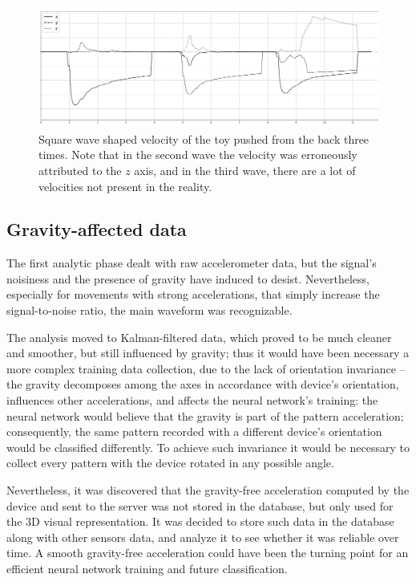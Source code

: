 \clearpage
\begin{figure}
	\includegraphics[width=\textwidth]{img/square.png}	
    \caption{Square wave shaped velocity of the toy pushed from the back three times. Note that in the second wave the velocity was erroneously attributed to the $z$ axis, and in the third wave, there are a lot of velocities not present in the reality.}
\end{figure}
\clearpage

\subsection{Gravity-affected data}
The first analytic phase dealt with raw accelerometer data, but the signal's noisiness and the presence of gravity have induced to desist. Nevertheless, especially for movements with strong accelerations, that simply increase the signal-to-noise ratio, the main waveform was recognizable.
\bigbreak

The analysis moved to Kalman-filtered data, which proved to be much cleaner and smoother, but still influenced by gravity; thus it would have been necessary a more complex training data collection, due to the lack of orientation invariance – the gravity decomposes among the axes in accordance with device's orientation, influences other accelerations, and affects the neural network's training: the neural network would believe that the gravity is part of the pattern acceleration; consequently, the same pattern recorded with a different device's orientation would be classified differently. To achieve such invariance it would be necessary to collect every pattern with the device rotated in any possible angle.
\bigbreak

Nevertheless, it was discovered that the gravity-free acceleration computed by the device and sent to the server was not stored in the database, but only used for the 3D visual representation. It was decided to store such data in the database along with other sensors data, and analyze it to see whether it was reliable over time. A smooth gravity-free acceleration could have been the turning point for an efficient neural network training and future classification.
\bigbreak

